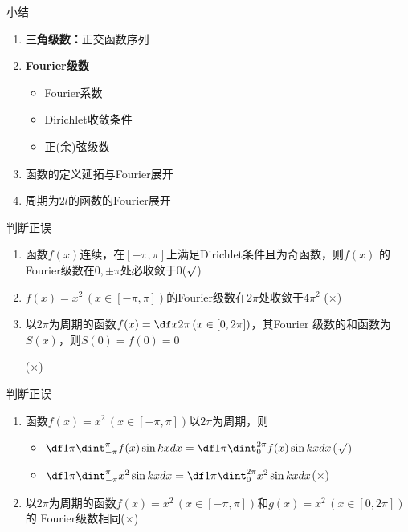 \begin{frame}[<+->]{小结}
	\linespread{1.5}
	\begin{enumerate}
	  \item {\bf 三角级数：}正交函数序列
	  \item {\bf Fourier级数}
	  \begin{itemize}
	    \item Fourier系数
	    \item Dirichlet收敛条件
	    \item 正(余)弦级数
	  \end{itemize}
	  \item 函数的定义延拓与Fourier展开
	  \item 周期为$2l$的函数的Fourier展开
	\end{enumerate}
\end{frame}

\begin{frame}{判断正误}
	\linespread{1.5}\pause 
	\begin{enumerate}
	  \item 函数$f(x)$连续，在$[-\pi,\pi]$上满足Dirichlet条件且为奇函数，则$f(x)$
	  的Fourier级数在$0,\pm\pi$处必收敛于$0$\pause\quad  (\;\alert{$\surd$}\;)\pause 
	  \item $f(x)=x^2\,(x\in[-\pi,\pi])$的Fourier级数在$2\pi$处收敛于$4\pi^2$
	  \pause  \quad(\;\alert{$\times$}\;)\pause 
	  \item 以$2\pi$为周期的函数$f(x)=\df x{2\pi}\,(x\in[0,2\pi])$，其Fourier
	  级数的和函数为$S(x)$，则$S(0)=f(0)=0$
	  
	  \pause\quad (\;\alert{$\times$}\;)
	\end{enumerate}
\end{frame}

\begin{frame}{判断正误}
	\linespread{1.5}
	\begin{enumerate}
	  \addtocounter{enumi}{3}
	  \item 函数$f(x)=x^2\,(x\in[-\pi,\pi])$以$2\pi$为周期，则\pause 
	  \begin{itemize}
	    \item $\df 1{\pi}\dint_{-\pi}^{\pi}f(x)\sin kxdx=\df
	    1{\pi}\dint_{0}^{2\pi}f(x)\sin kxdx$\pause\quad (\;\alert{$\surd$}\;)\pause 
	    \item $\df 1{\pi}\dint_{-\pi}^{\pi}x^2\sin kxdx=\df
	    1{\pi}\dint_{0}^{2\pi}x^2\sin kxdx$\pause\quad (\;\alert{$\times$}\;)\pause 
	  \end{itemize}
	  \item 以$2\pi$为周期的函数$f(x)=x^2\,(x\in[-\pi,\pi])$和$g(x)=x^2\,(x\in[0,2\pi])$的
	  Fourier级数相同\pause\quad (\;\alert{$\times$}\;)
	\end{enumerate}
\end{frame}

